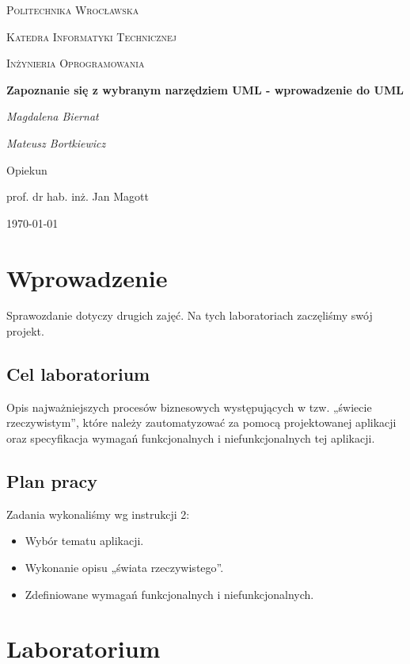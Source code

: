 \documentclass{article}
\begin{document}
\begin{titlepage}
\centering
{\scshape\LARGE Politechnika Wrocławska \par}
{\scshape\Large Katedra Informatyki Technicznej\par}

	\vspace{1cm}
	{\scshape\Large Inżynieria Oprogramowania\par}
	\vspace{1.5cm}
	{\huge\bfseries Zapoznanie się z wybranym narzędziem UML - wprowadzenie do UML\par}
	\vspace{2cm}
	{\Large\itshape Magdalena Biernat\par}
	{\Large\itshape Mateusz Bortkiewicz\par}
	\vfill
	Opiekun\par
	prof. dr hab. inż. Jan Magott 

	\vfill
	{\large \today\par}
\end{titlepage}
\newpage

\section{Wprowadzenie}
Sprawozdanie dotyczy drugich zajęć. Na tych laboratoriach zaczęliśmy swój projekt. 

\subsection{Cel laboratorium}
Opis najważniejszych procesów biznesowych występujących w tzw. „świecie rzeczywistym”, które należy zautomatyzować za pomocą projektowanej aplikacji oraz specyfikacja wymagań funkcjonalnych i niefunkcjonalnych tej aplikacji.

\subsection{Plan pracy}
Zadania wykonaliśmy wg instrukcji 2:
\begin{itemize}
\item Wybór tematu aplikacji.
\item Wykonanie opisu „świata rzeczywistego”.
\item Zdefiniowane wymagań funkcjonalnych i niefunkcjonalnych. 
\end{itemize}
\section{Laboratorium}
\end{document}
